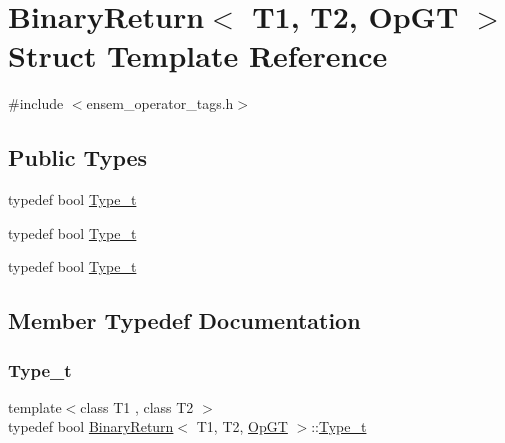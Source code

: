 \hypertarget{structBinaryReturn_3_01T1_00_01T2_00_01OpGT_01_4}{}\section{Binary\+Return$<$ T1, T2, Op\+GT $>$ Struct Template Reference}
\label{structBinaryReturn_3_01T1_00_01T2_00_01OpGT_01_4}


{\ttfamily \#include $<$ensem\+\_\+operator\+\_\+tags.\+h$>$}

\subsection*{Public Types}
\begin{DoxyCompactItemize}
\item 
typedef bool \mbox{\hyperlink{structBinaryReturn_3_01T1_00_01T2_00_01OpGT_01_4_ac4478a3194da16a795fb10b5a100ff48}{Type\+\_\+t}}
\item 
typedef bool \mbox{\hyperlink{structBinaryReturn_3_01T1_00_01T2_00_01OpGT_01_4_ac4478a3194da16a795fb10b5a100ff48}{Type\+\_\+t}}
\item 
typedef bool \mbox{\hyperlink{structBinaryReturn_3_01T1_00_01T2_00_01OpGT_01_4_ac4478a3194da16a795fb10b5a100ff48}{Type\+\_\+t}}
\end{DoxyCompactItemize}


\subsection{Member Typedef Documentation}
\mbox{\label{structBinaryReturn_3_01T1_00_01T2_00_01OpGT_01_4_ac4478a3194da16a795fb10b5a100ff48}} 
\subsubsection{\texorpdfstring{Type\_t}{Type\_t}\hspace{0.1cm}{\footnotesize\ttfamily [1/3]}}
{\footnotesize\ttfamily template$<$class T1 , class T2 $>$ \\
typedef bool \mbox{\hyperlink{structBinaryReturn}{Binary\+Return}}$<$ T1, T2, \mbox{\hyperlink{structOpGT}{Op\+GT}} $>$\+::\mbox{\hyperlink{structBinaryReturn_3_01T1_00_01T2_00_01OpGT_01_4_ac4478a3194da16a795fb10b5a100ff48}{Type\+\_\+t}}}

